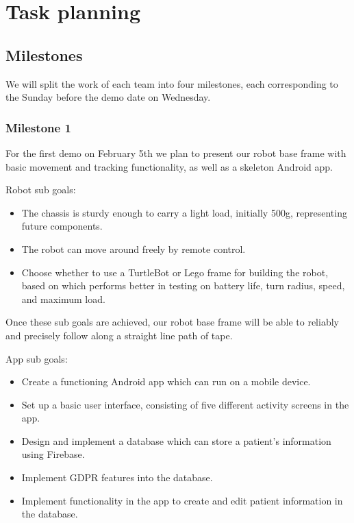 \documentclass{article}
\begin{document}
\section{Task planning}

\subsection{Milestones} 
We will split the work of each team into four milestones, each corresponding to the Sunday before the demo date on Wednesday. 

\subsubsection{Milestone 1}
For the first demo on February 5th we plan to present our robot base frame with basic movement and tracking functionality, as well as a skeleton Android app.

Robot sub goals:
\begin{itemize}
\item The chassis is sturdy enough to carry a light load, initially 500g, representing future components. %
\item The robot can move around freely by remote control.
\item Choose whether to use a TurtleBot or Lego frame for building the robot, based on which performs better in testing on battery life, turn radius, speed, and maximum load. 
\end{itemize}


Once these sub goals are achieved, our robot base frame will be able to reliably and precisely follow along a straight line path of tape. 

App sub goals:
\begin{itemize}
\item Create a functioning Android app which can run on a mobile device. %
\item Set up a basic user interface, consisting of five different activity screens in the app. 
\item Design and implement a database which can store a patient's information using Firebase.
\item Implement GDPR features into the database. %
\item Implement functionality in the app to create and edit patient information in the database.
\end{itemize}
\end{document}
